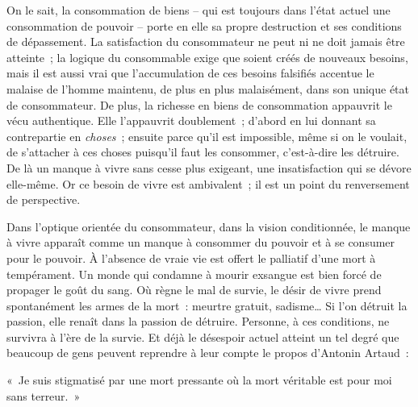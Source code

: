 \documentclass[french,twoside]{book} %
\newenvironment{quoteblock}%
  {\begin{quoting}}
  {\end{quoting}}
\newenvironment{quotebar}{%
    \def\FrameCommand{{\color{rubric!10!}\vrule width 0.5em} \hspace{0.9em}}%
    \def\OuterFrameSep{\itemsep} %
    \MakeFramed {\advance\hsize-\width \FrameRestore}
  }%
  {%
    \endMakeFramed
  }
\renewenvironment{quoteblock}%
  {%
    \savenotes
    \setstretch{0.9}
    \normalfont
    \begin{quotebar}
  }
  {%
    \end{quotebar}
    \spewnotes
  }
\begin{document}
On le sait, la consommation de biens – qui est toujours dans l’état actuel une consommation de pouvoir – porte en elle sa propre destruction et ses conditions de dépassement. La satisfaction du consommateur ne peut ni ne doit jamais être atteinte ; la logique du consommable exige que soient créés de nouveaux besoins, mais il est aussi vrai que l’accumulation de ces besoins falsifiés accentue le malaise de l’homme maintenu, de plus en plus malaisément, dans son unique état de consommateur. De plus, la richesse en biens de consommation appauvrit le vécu authentique. Elle l’appauvrit doublement ; d’abord en lui donnant sa contrepartie en \emph{choses} ; ensuite parce qu’il est impossible, même si on le voulait, de s’attacher à ces choses puisqu’il faut les consommer, c’est-à-dire les détruire. De là un manque à vivre sans cesse plus exigeant, une insatisfaction qui se dévore elle-même. Or ce besoin de vivre est ambivalent ; il est un point du renversement de perspective.\par
Dans l’optique orientée du consommateur, dans la vision conditionnée, le manque à vivre apparaît comme un manque à consommer du pouvoir et à se consumer pour le pouvoir. À l’absence de vraie vie est offert le palliatif d’une mort à tempérament. Un monde qui condamne à mourir exsangue est bien forcé de propager le goût du sang. Où règne le mal de survie, le désir de vivre prend spontanément les armes de la mort : meurtre gratuit, sadisme… Si l’on détruit la passion, elle renaît dans la passion de détruire. Personne, à ces conditions, ne survivra à l’ère de la survie. Et déjà le désespoir actuel atteint un tel degré que beaucoup de gens peuvent reprendre à leur compte le propos d’Antonin Artaud :\par

\begin{quoteblock}
\noindent « Je suis stigmatisé par une mort pressante où la mort véritable est pour moi sans terreur. »\end{quoteblock}
\end{document}
